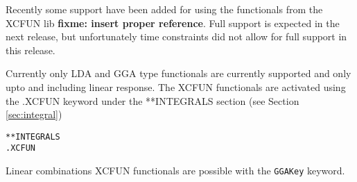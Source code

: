 \begin{description}
Recently some support have been added for using the functionals from the XCFUN lib \textbf{fixme: insert proper reference}. Full 
support is expected in the next release, but unfortunately time constraints did not allow for 
full support in this release. 

Currently only LDA and GGA type functionals are currently supported and only upto and including 
linear response. The XCFUN functionals are activated using the .XCFUN keyword under the **INTEGRALS section (see Section \ref{sec:integral})
\begin{verbatim}
**INTEGRALS
.XCFUN
\end{verbatim} 
Linear combinations XCFUN functionals are possible with the \verb|GGAKey| keyword.

\end{description}


